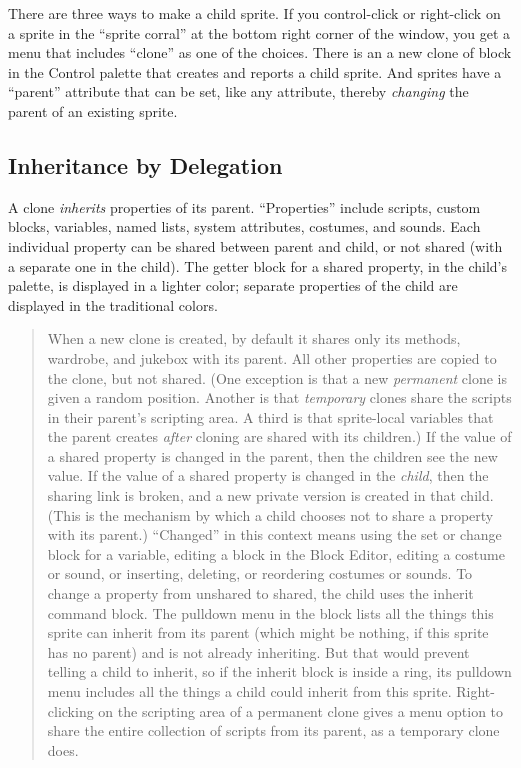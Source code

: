 There are three ways to make a child sprite. If you control-click or
right-click on a sprite in the ``sprite corral'' at the bottom right
corner of the window, you get a menu that includes ``clone'' as one of
the choices. There is an a new clone of block in the Control palette
that creates and reports a child sprite. And sprites have a ``parent''
attribute that can be set, like any attribute, thereby \emph{changing}
the parent of an existing sprite.

\subsection{\texorpdfstring{ Inheritance by
Delegation}{ Inheritance by Delegation}}\label{inheritance-by-delegation}

A clone \emph{inherits} properties of its parent. ``Properties'' include
scripts, custom blocks, variables, named lists, system attributes,
costumes, and sounds. Each individual property can be shared between
parent and child, or not shared (with a separate one in the child). The
getter block for a shared property, in the child's palette, is displayed
in a lighter color; separate properties of the child are displayed in
the traditional colors.

\begin{quote}
When a new clone is created, by default it shares only its methods,
wardrobe, and jukebox with its parent. All other properties are copied
to the clone, but not shared. (One exception is that a new
\emph{permanent} clone is given a random position. Another is that
\emph{temporary} clones share the scripts in their parent's scripting
area. A third is that sprite-local variables that the parent creates
\emph{after} cloning are shared with its children.) If the value of a
shared property is changed in the parent, then the children see the new
value. If the value of a shared property is changed in the \emph{child},
then the sharing link is broken, and a new private version is created in
that child. (This is the mechanism by which a child chooses not to share
a property with its parent.) ``Changed'' in this context means using the
set or change block for a variable, editing a block in the Block Editor,
editing a costume or sound, or inserting, deleting, or reordering
costumes or sounds. To change a property from unshared to shared, the
child uses the inherit command block. The pulldown menu in the block
lists all the things this sprite can inherit from its parent (which
might be nothing, if this sprite has no parent) and is not already
inheriting. But that would prevent telling a child to inherit, so if the
inherit block is inside a ring, its pulldown menu includes all the
things a child could inherit from this sprite. Right-clicking on the
scripting area of a permanent clone gives a menu option to share the
entire collection of scripts from its parent, as a temporary clone does.
\end{quote}

